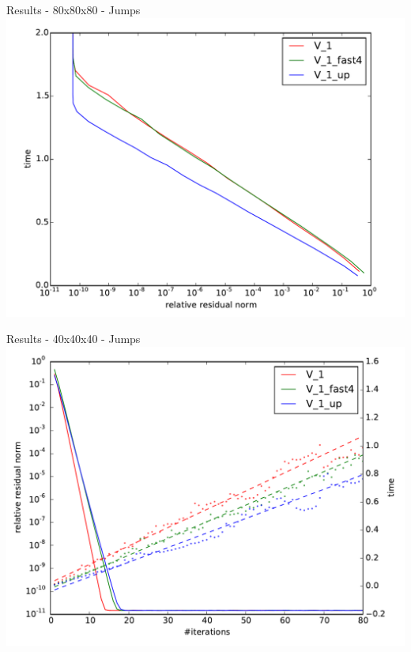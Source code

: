 \documentclass{beamer}
\begin{document}
\begin{frame}{Results - 80x80x80 - Jumps}
 \includegraphics[width=\linewidth]{AMG2006/test/DELL/jumps/time_convergence_fast_10.pdf}
\end{frame}
\begin{frame}{Results - 40x40x40 - Jumps}
 \includegraphics[width=\linewidth]{AMG2006/test/DELL/jumps/convergence_fast.pdf}
\end{frame}
\end{document}
